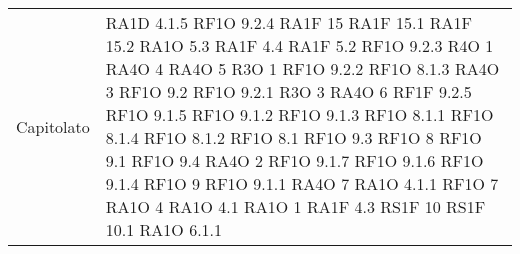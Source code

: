 \begin{center}
\begin{longtable}{ | p{5cm} | p{5cm} |}
            Capitolato &  RA1D 4.1.5 \newline  RF1O 9.2.4 \newline  RA1F 15 \newline  RA1F 15.1 \newline  RA1F 15.2 \newline  RA1O 5.3 \newline  RA1F 4.4 \newline  RA1F 5.2 \newline  RF1O 9.2.3 \newline  R4O 1 \newline  RA4O 4 \newline  RA4O 5 \newline  R3O 1 \newline  RF1O 9.2.2  \newline  RF1O 8.1.3  \newline  RA4O 3 \newline  RF1O 9.2 \newline  RF1O 9.2.1  \newline  R3O 3 \newline  RA4O 6 \newline  RF1F 9.2.5 \newline  RF1O 9.1.5 \newline  RF1O 9.1.2  \newline  RF1O 9.1.3  \newline  RF1O 8.1.1  \newline  RF1O 8.1.4  \newline  RF1O 8.1.2 \newline  RF1O 8.1  \newline  RF1O 9.3 \newline  RF1O 8  \newline  RF1O 9.1  \newline  RF1O 9.4 \newline  RA4O 2 \newline  RF1O 9.1.7 \newline  RF1O 9.1.6 \newline  RF1O 9.1.4  \newline  RF1O 9  \newline  RF1O 9.1.1  \newline  RA4O 7 \newline  RA1O 4.1.1  \newline  RF1O 7 \newline  RA1O 4 \newline  RA1O 4.1  \newline  RA1O 1 \newline  RA1F 4.3 \newline  RS1F 10 \newline  RS1F 10.1 \newline  RA1O 6.1.1  \newline 
\end{longtable}
\end{center}
